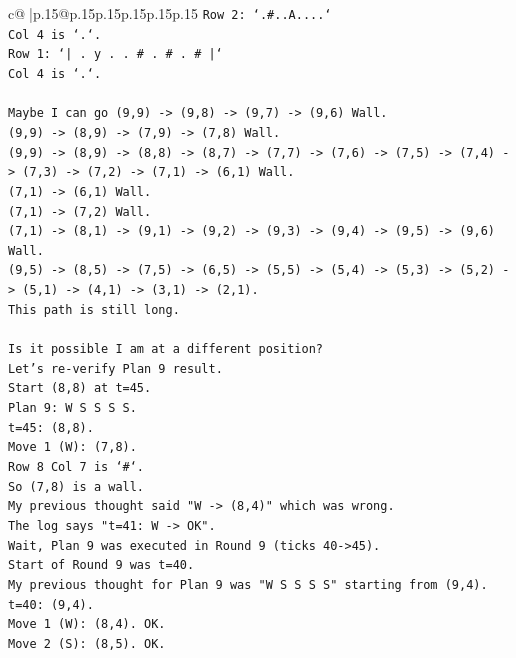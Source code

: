 \documentclass{article}
\begin{document}
{\begin{supertabular}{c@{$\;$}|p{.15\linewidth}@{}p{.15\linewidth}p{.15\linewidth}p{.15\linewidth}p{.15\linewidth}p{.15\linewidth}}
{{{\texttt{Row 2: `.\#..A....`} \\
\texttt{Col 4 is `.`.} \\
\texttt{Row 1: `| . y . . \# . \# . \# |`} \\
\texttt{Col 4 is `.`.} \\
\\ 
\texttt{Maybe I can go (9,9) {-}> (9,8) {-}> (9,7) {-}> (9,6) Wall.} \\
\texttt{(9,9) {-}> (8,9) {-}> (7,9) {-}> (7,8) Wall.} \\
\texttt{(9,9) {-}> (8,9) {-}> (8,8) {-}> (8,7) {-}> (7,7) {-}> (7,6) {-}> (7,5) {-}> (7,4) {-}> (7,3) {-}> (7,2) {-}> (7,1) {-}> (6,1) Wall.} \\
\texttt{(7,1) {-}> (6,1) Wall.} \\
\texttt{(7,1) {-}> (7,2) Wall.} \\
\texttt{(7,1) {-}> (8,1) {-}> (9,1) {-}> (9,2) {-}> (9,3) {-}> (9,4) {-}> (9,5) {-}> (9,6) Wall.} \\
\texttt{(9,5) {-}> (8,5) {-}> (7,5) {-}> (6,5) {-}> (5,5) {-}> (5,4) {-}> (5,3) {-}> (5,2) {-}> (5,1) {-}> (4,1) {-}> (3,1) {-}> (2,1).} \\
\texttt{This path is still long.} \\
\\ 
\texttt{Is it possible I am at a different position?} \\
\texttt{Let's re{-}verify Plan 9 result.} \\
\texttt{Start (8,8) at t=45.} \\
\texttt{Plan 9: W S S S S.} \\
\texttt{t=45: (8,8).} \\
\texttt{Move 1 (W): (7,8).} \\
\texttt{Row 8 Col 7 is `\#`.} \\
\texttt{So (7,8) is a wall.} \\
\texttt{My previous thought said "W {-}> (8,4)" which was wrong.} \\
\texttt{The log says "t=41: W {-}> OK".} \\
\texttt{Wait, Plan 9 was executed in Round 9 (ticks 40{-}>45).} \\
\texttt{Start of Round 9 was t=40.} \\
\texttt{My previous thought for Plan 9 was "W S S S S" starting from (9,4).} \\
\texttt{t=40: (9,4).} \\
\texttt{Move 1 (W): (8,4). OK.} \\
\texttt{Move 2 (S): (8,5). OK.} \\
}}}
\end{supertabular}}
\end{document}
